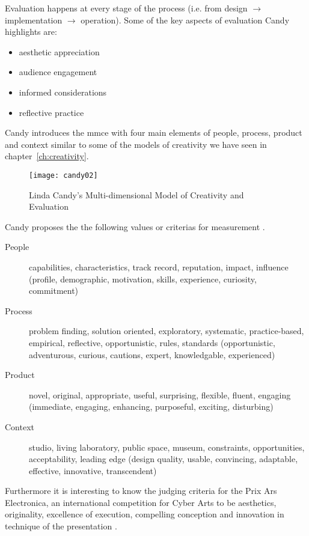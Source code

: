Evaluation happens at every stage of the process (i.e. from design $\to$ implementation $\to$ operation). Some of the key aspects of evaluation Candy highlights are:

\begin{itemize}
  \item aesthetic appreciation
  \item audience engagement
  \item informed considerations
  \item reflective practice
\end{itemize}

Candy introduces the \gls{mmce} with four main elements of people, process, product and context \autocite[p.11]{Candy2012} similar to some of the models of creativity we have seen in chapter~\ref{ch:creativity}.

\begin{figure}[!htbp] %
  \centering
  \texttt{[image: candy02]}
\caption[Multi-dimensional Model of Creativity and Evaluation]{Linda Candy's Multi-dimensional Model of Creativity and Evaluation}
\label{fig:candy02}
\end{figure}

Candy proposes the the following values or criterias for measurement \autocite{Candy2012}.

\begin{description}
  \item [People] capabilities, characteristics, track record, reputation, impact, influence (profile, demographic, motivation, skills, experience, curiosity, commitment)
  \item [Process] problem finding, solution oriented, exploratory, systematic, practice-based, empirical, reflective, opportunistic, rules, standards (opportunistic, adventurous, curious, cautions, expert, knowledgable, experienced)
  \item [Product] novel, original, appropriate, useful, surprising, flexible, fluent, engaging (immediate, engaging, enhancing, purposeful, exciting, disturbing)
  \item [Context] studio, living laboratory, public space, museum, constraints, opportunities, acceptability, leading edge (design quality, usable, convincing, adaptable, effective, innovative, transcendent)
\end{description}

Furthermore it is interesting to know the judging criteria for the Prix Ars Electronica, an international competition for Cyber Arts to be aesthetics, originality, excellence of execution, compelling conception and innovation in technique of the presentation \autocite[cited in][p.18]{Candy2012}.

